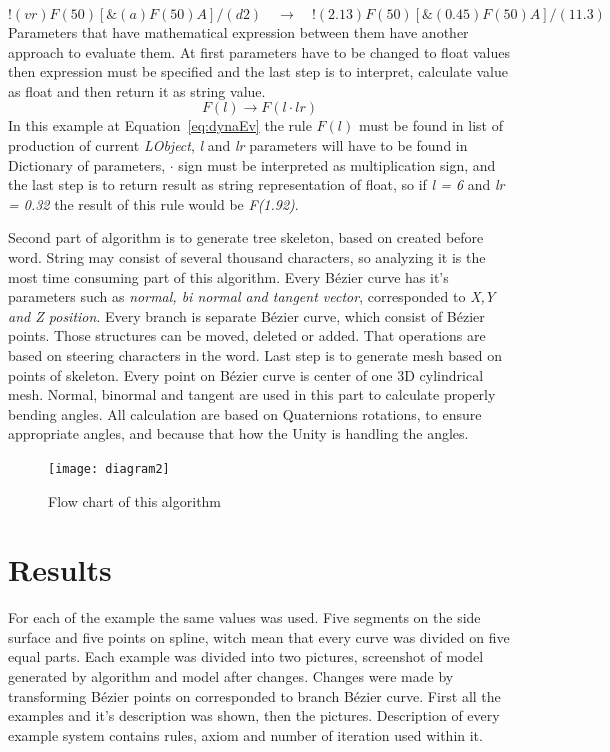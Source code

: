 \documentclass[b5paper,twoside,11pt]{article}
\begin{document}
\begin{equation} \label{eq:staticEv}
!(vr)F(50)[ \&(a)F(50)A]/(d2) \quad\longrightarrow\quad !(2.13)F(50)[ \&(0.45)F(50)A]/(11.3)
 \end{equation}
\newpage
Parameters that have mathematical expression between them have another approach to evaluate them. At first parameters have to be changed to float values then expression must be specified and the last step is to interpret, calculate value as float and then return it as string value.
  \begin{equation}\label{eq:dynaEv}
  F(l) \rightarrow F(l \cdot lr)
  \end{equation}
  In this example at Equation~\ref{eq:dynaEv} the rule $F(l)$ must be found in list of production of current \textit{LObject}, \textit{l} and \textit{lr} parameters will have to be found in Dictionary of parameters, $ \cdot$ sign must be interpreted as multiplication sign, and the last step is to return result as string representation of float, so if \textit{l = 6} and \textit{lr = 0.32} the result of this rule would be \textit{F(1.92)}.\par
Second part of algorithm is to generate tree skeleton, based on created before word. String may consist of several thousand characters, so analyzing it is the most time consuming part of this algorithm.
Every Bézier curve has it's parameters such as \textit{normal, bi normal and tangent vector}, corresponded to \textit{X,Y and Z position}. Every branch is separate Bézier curve, which consist of Bézier points. Those structures can be moved, deleted or added. That operations are based on steering characters in the word.	
Last step is to generate  mesh based on points of skeleton. Every point on Bézier curve is center of one 3D cylindrical mesh. Normal, binormal and tangent are used in this part to calculate properly bending angles.
All calculation are based on Quaternions rotations, to ensure appropriate angles, and because that how the Unity is handling the angles.
\begin{figure}[!htp]
\centering
  \texttt{[image: diagram2]}
\caption{Flow chart of this algorithm \label{diagram}}
\end{figure}



\section{Results}
For each of the example the same values was used. Five segments on the side surface and five points on spline, witch mean that every curve was divided on five equal parts. Each example was divided into two pictures, screenshot of model generated by algorithm and model after changes. Changes were made by transforming Bézier points on corresponded to branch Bézier curve. First all the examples and it's description was shown, then the pictures. Description of every example system contains rules, axiom and number of iteration used within it.
\end{document}
